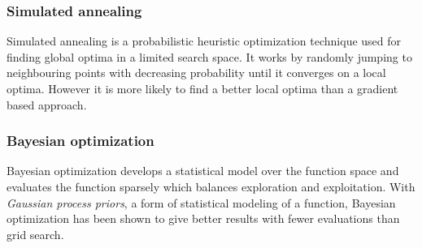 \subsubsection{Simulated annealing}

Simulated annealing is a probabilistic heuristic optimization technique used for finding global optima in a limited search space. It works by randomly jumping to neighbouring points with decreasing probability until it converges on a local optima. However it is more likely to find a better local optima than a gradient based approach. \citep{norvigAI}


\subsubsection{Bayesian optimization}

Bayesian optimization develops a statistical model over the function space and evaluates the function sparsely which balances exploration and exploitation.  With \textit{Gaussian process priors}, a form of statistical modeling of a function, Bayesian optimization has been shown to give better results with fewer evaluations than grid search. \citep{snoek2012practical}

